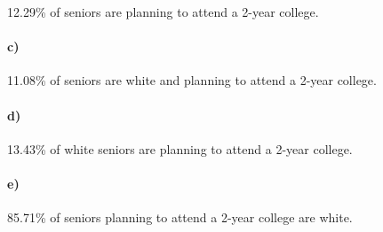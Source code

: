 \documentclass[12pt]{article}
\begin{document}
12.29\% of seniors are planning to attend a 2-year college.

\paragraph{c)}

11.08\% of seniors are white and planning to attend a 2-year college.

\paragraph{d)}

13.43\% of white seniors are planning to attend a 2-year college.

\paragraph{e)}

85.71\% of seniors planning to attend a 2-year college are white.
\end{document}
